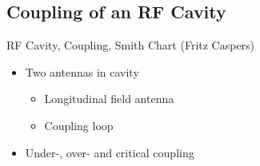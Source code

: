 \documentclass{beamer}
\begin{document}
\subsection{Coupling of an RF Cavity}
\begin{frame}[t,fragile]{RF Cavity, Coupling, Smith Chart (Fritz Caspers)}
\begin{itemize}
\item  Two antennas in cavity
\begin{itemize}
\item Longitudinal field antenna
\item Coupling loop
\end{itemize}
\item Under-, over- and critical coupling
\end{itemize}
\begin{figure}
  \centering\setcounter{subfigure}{0}
  \;
  \;
\end{figure}
\end{frame}
\end{document}
